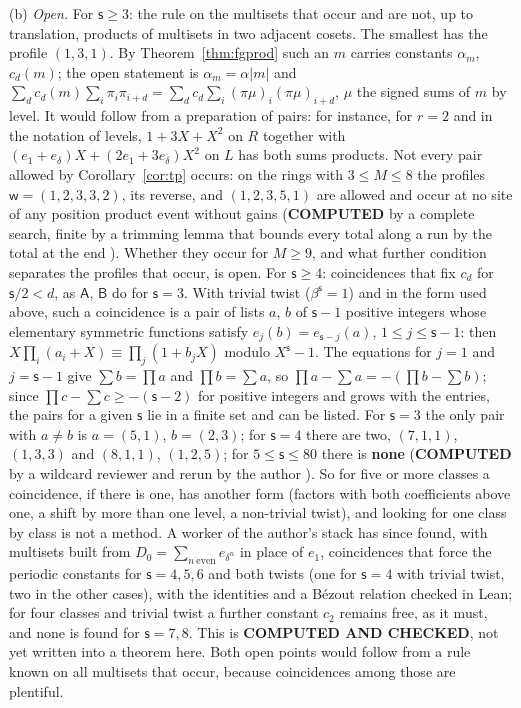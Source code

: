 \begin{remark}
(b) \emph{Open.} For $\mathsf{s}\ge3$: the rule on the multisets that occur and are not, up to translation, products of multisets in two adjacent cosets. The smallest has the profile $(1,3,1)$. By Theorem~\ref{thm:fgprod} such an $m$ carries constants $\alpha_m$, $c_d(m)$; the open statement is $\alpha_m=\alpha|m|$ and $\sum_dc_d(m)\sum_i\pi_i\pi_{i+d}=\sum_dc_d\sum_i(\pi\mu)_i(\pi\mu)_{i+d}$, $\mu$ the signed sums of $m$ by level. It would follow from a preparation of pairs: for instance, for $r=2$ and in the notation of levels, $1+3X+X^{2}$ on $R$ together with $(e_1+e_\delta)X+(2e_1+3e_\delta)X^{2}$ on $L$ has both sums products. Not every pair allowed by Corollary~\ref{cor:tp} occurs: on the rings with $3\le M\le8$ the profiles $\mathsf{w}=(1,2,3,3,2)$, its reverse, and $(1,2,3,5,1)$ are allowed and occur at no site of any position product event without gains (\textbf{COMPUTED} by a complete search, finite by a trimming lemma that bounds every total along a run by the total at the end \cite{comptp}). Whether they occur for $M\ge9$, and what further condition separates the profiles that occur, is open. For $\mathsf{s}\ge4$: coincidences that fix $c_d$ for $\mathsf{s}/2<d$, as $\mathsf{A}$, $\mathsf{B}$ do for $\mathsf{s}=3$. With trivial twist ($\beta^{\mathsf{s}}=1$) and in the form used above, such a coincidence is a pair of lists $a$, $b$ of $\mathsf{s}-1$ positive integers whose elementary symmetric functions satisfy $e_j(b)=e_{\mathsf{s}-j}(a)$, $1\le j\le\mathsf{s}-1$: then $X\prod_i(a_i+X)\equiv\prod_j(1+b_jX)$ modulo $X^{\mathsf{s}}-1$. The equations for $j=1$ and $j=\mathsf{s}-1$ give $\sum b=\prod a$ and $\prod b=\sum a$, so $\prod a-\sum a=-(\prod b-\sum b)$; since $\prod c-\sum c\ge-(\mathsf{s}-2)$ for positive integers and grows with the entries, the pairs for a given $\mathsf{s}$ lie in a finite set and can be listed. For $\mathsf{s}=3$ the only pair with $a\ne b$ is $a=(5,1)$, $b=(2,3)$; for $\mathsf{s}=4$ there are two, $(7,1,1)$, $(1,3,3)$ and $(8,1,1)$, $(1,2,5)$; for $5\le\mathsf{s}\le80$ there is \textbf{none} (\textbf{COMPUTED} by a wildcard reviewer and rerun by the author \cite{comptp}). So for five or more classes a coincidence, if there is one, has another form (factors with both coefficients above one, a shift by more than one level, a non-trivial twist), and looking for one class by class is not a method. A worker of the author's stack has since found, with multisets built from $D_0=\sum_{n\ \mathrm{even}}e_{\delta^n}$ in place of $e_1$, coincidences that force the periodic constants for $\mathsf{s}=4,5,6$ and both twists (one for $\mathsf{s}=4$ with trivial twist, two in the other cases), with the identities and a B\'ezout relation checked in Lean; for four classes and trivial twist a further constant $c_2$ remains free, as it must, and none is found for $\mathsf{s}=7,8$. This is \textbf{COMPUTED AND CHECKED}, not yet written into a theorem here. Both open points would follow from a rule known on all multisets that occur, because coincidences among those are plentiful.

\end{remark}

